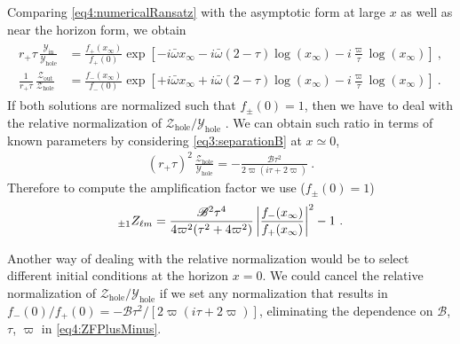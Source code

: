 Comparing \eqref{eq4:numericalRansatz} with the asymptotic form at large $x$ as well as near the horizon form, we obtain
\begin{align}
	\label{eq4:YinZoutFInf}
	\begin{split}
		r_{+} \tau \,\frac{\mathscr{Y}_\mathrm{in}}{\mathscr{Y}_\mathrm{hole}} &= \frac{f_{+}(x_\infty)}{f_{+}(0)} \exp\left[ - i \bar{\omega} x_\infty - i \bar{\omega} (2-\tau)\log(x_\infty)   -i \frac{\varpi}{\tau} \log(x_\infty) \right] ~, \\[0.15cm]
		\frac{1}{r_{+} \tau} \,\frac{\mathscr{Z}_\mathrm{out}}{\mathscr{Z}_\mathrm{hole}} &= \frac{f_{-}(x_\infty)}{f_{-}(0)} \exp\left[ + i \bar{\omega} x_\infty + i \bar{\omega} (2-\tau)\log(x_\infty) -i \frac{\varpi}{\tau} \log(x_\infty) \right] ~.
	\end{split}
\end{align}
If both solutions are normalized such that $f_{\pm}(0) = 1$, then we have to deal with the relative normalization of $\mathscr{Z}_\mathrm{hole}/\mathscr{Y}_\mathrm{hole}$ \cite{Teukolsky1974}. We can obtain such ratio in terms of known parameters by considering \eqref{eq3:separationB} at $x\simeq0$,
\begin{align}
	(r_{+} \tau)^2 \,\frac{\mathscr{Z}_\mathrm{hole}}{\mathscr{Y}_\mathrm{hole}} = -\frac{\mathscr{B} \tau^2 }{2 \varpi (i \tau + 2 \varpi)} ~.
\end{align}
Therefore to compute the amplification factor we use ($f_{\pm}(0)=1$)
\begin{align}
	\label{eq4:ZFPlusMinus}
	\uu[\pm 1]{Z}{\ell m} = \frac{\mathscr{B}^2 \tau^4 }{4 \varpi^2 (\tau^2 + 4 \varpi^2)} \left| \frac{f_{-}(x_\infty)}{f_{+}(x_\infty)} \right|^2 - 1 ~.
\end{align}

Another way of dealing with the relative normalization would be to select different initial conditions at the horizon $x=0$.
We could cancel the relative normalization of $\mathscr{Z}_\mathrm{hole}/\mathscr{Y}_\mathrm{hole}$ if we set any normalization that results in $f_{-}(0)/f_{+}(0) = -\mathscr{B} \tau^2 /[2 \varpi (i \tau + 2 \varpi)]$, eliminating the dependence on $\mathscr{B}$, $\tau$, $\varpi$ in \eqref{eq4:ZFPlusMinus}.

